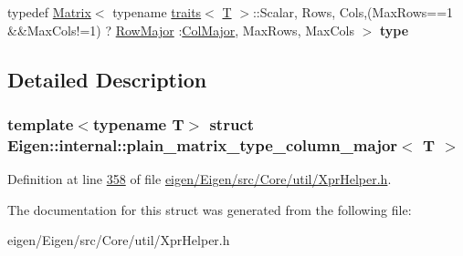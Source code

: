 \begin{DoxyCompactItemize}
\item 
\mbox{\label{struct_eigen_1_1internal_1_1plain__matrix__type__column__major_a654e6577d45ae0cfb657d21311124850}} 
typedef \hyperlink{group___core___module_class_eigen_1_1_matrix}{Matrix}$<$ typename \hyperlink{struct_eigen_1_1internal_1_1traits}{traits}$<$ \hyperlink{group___sparse_core___module}{T} $>$\+::Scalar, Rows, Cols,(Max\+Rows==1 \&\&Max\+Cols!=1) ? \hyperlink{group__enums_ggaacded1a18ae58b0f554751f6cdf9eb13acfcde9cd8677c5f7caf6bd603666aae3}{Row\+Major} \+:\hyperlink{group__enums_ggaacded1a18ae58b0f554751f6cdf9eb13a0cbd4bdd0abcfc0224c5fcb5e4f6669a}{Col\+Major}, Max\+Rows, Max\+Cols $>$ {\bfseries type}
\end{DoxyCompactItemize}


\subsection{Detailed Description}
\subsubsection*{template$<$typename T$>$\newline
struct Eigen\+::internal\+::plain\+\_\+matrix\+\_\+type\+\_\+column\+\_\+major$<$ T $>$}



Definition at line \hyperlink{eigen_2_eigen_2src_2_core_2util_2_xpr_helper_8h_source_l00358}{358} of file \hyperlink{eigen_2_eigen_2src_2_core_2util_2_xpr_helper_8h_source}{eigen/\+Eigen/src/\+Core/util/\+Xpr\+Helper.\+h}.



The documentation for this struct was generated from the following file\+:\begin{DoxyCompactItemize}
\item 
eigen/\+Eigen/src/\+Core/util/\+Xpr\+Helper.\+h\end{DoxyCompactItemize}
